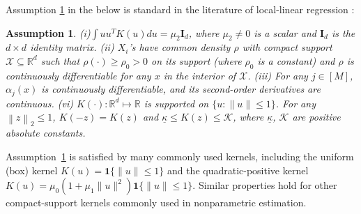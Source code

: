 \documentclass[11pt]{article}
\newtheorem{assumption}{Assumption}
\newcommand{\norm}[1]{\left\lVert #1 \right\rVert}
\begin{document}
Assumption \ref{ass:local-linear} in the below is standard in the literature of local-linear regression \citep[e.g.][]{ruppert1994multivariate,fan1993local,lu1996multivariate, fan2003nonlinear}:
\begin{assumption}\label{ass:local-linear}
(i)$\int uu^TK(u)du=\mu_2\mathbf{I}_{d}$, where $\mu_2\neq0$ is a scalar and $\mathbf{I}_{d}$ is the $d\times d$ identity matrix. (ii) $X_i$'s have common density $\rho$ with compact support $\mathcal{X}\subseteq\mathbb{R}^d$ such that $\rho(\cdot)\geq\rho_0>0$ on its support (where $\rho_0$ is a constant) and $\rho$ is continuously differentiable for any $x$ in the interior of $\mathcal X$. (iii) For any $j\in[M]$, $\alpha_j(x)$ is continuously differentiable, and its second-order derivatives are continuous. (vi)  $K(\cdot): \mathbb{R}^d\mapsto\mathbb{R}$ is supported on $\{u:\|u\|\leq1\}$. For any $\norm{z}_2\leq1$, $K(-z)=K(z)$ and $\underline{\kappa}\leq K(z)\leq\mathcal{K}$, where $\underline{\kappa}$, $\mathcal{K}$ are positive absolute constants.
\end{assumption}
Assumption~\ref{ass:local-linear} is satisfied by many commonly used kernels, including the uniform (box) kernel $K(u)=\mathbf{1}\{\|u\|\leq1\}$ and the quadratic-positive kernel $K(u)=\mu_0(1+\mu_1\|u\|^2)\mathbf{1}\{\|u\|\leq1\}$. Similar properties hold for other compact-support kernels commonly used in nonparametric estimation. 
\end{document}

